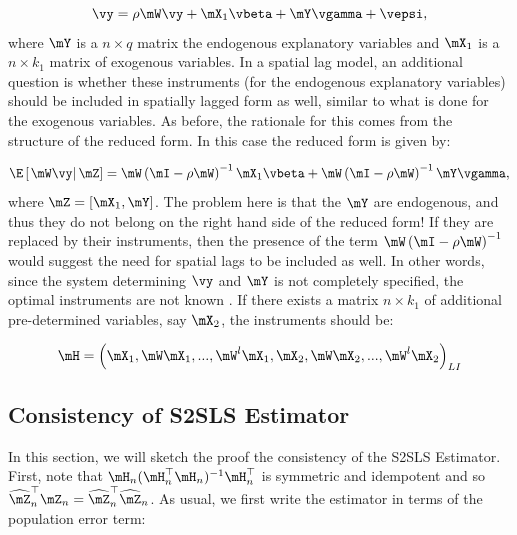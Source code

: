 \documentclass[english,12pt]{book}\usepackage[]{graphicx}\usepackage[]{xcolor}
\begin{document}
\begin{equation*}
  \vy = \rho\mW\vy + \mX_1\vbeta + \mY\vgamma + \vepsi,
\end{equation*}
%
where $\mY$ is a $n\times q$ matrix the endogenous explanatory variables and $\mX_1$ is a $n\times k_1$ matrix of exogenous variables. In a spatial lag model, an additional question is whether these instruments (for the endogenous explanatory variables) should be included in spatially lagged form as well, similar to what is done for the exogenous variables. As before, the rationale for this comes from the structure of the reduced form.  In this case the reduced form is given by:


\begin{equation*}
\E\left[\left.\mW\vy\right|\mZ\right] = \mW\left(\mI - \rho\mW\right)^{-1}\mX_1\vbeta + \mW\left(\mI - \rho\mW\right)^{-1}\mY\vgamma,
\end{equation*}
%
where $\mZ = \left[\mX_1, \mY\right]$. The problem here is that the $\mY$ are endogenous, and thus they do not belong on the right hand side of the reduced form!  If they are replaced by their instruments, then the presence of the term $\mW\left(\mI - \rho\mW\right)^{-1}$ would suggest the need for spatial lags to be included as well. In other words, since the system determining $\vy$ and $\mY$ is not completely specified, the optimal instruments are not known \citep{spdep}. If there exists a matrix $n \times k_1$ of additional pre-determined variables, say $\mX_2$, the instruments should be:

\begin{equation}
\mH = \left(\mX_1, \mW\mX_1, ..., \mW^l\mX_1, \mX_2, \mW\mX_2, ..., \mW^l\mX_2\right)_{LI}
\end{equation}

\subsection{Consistency of S2SLS Estimator}

In this section, we will sketch the proof the consistency of the S2SLS Estimator. First, note that $\mH_n(\mH_n^\top\mH_n)^{-1}\mH_n^\top$ is symmetric and idempotent and so $\widehat{\mZ}_n^\top\mZ_n= \widehat{\mZ}_n^\top\widehat{\mZ}_n$. As usual, we first write the estimator in terms of the population error term: 
\end{document}

